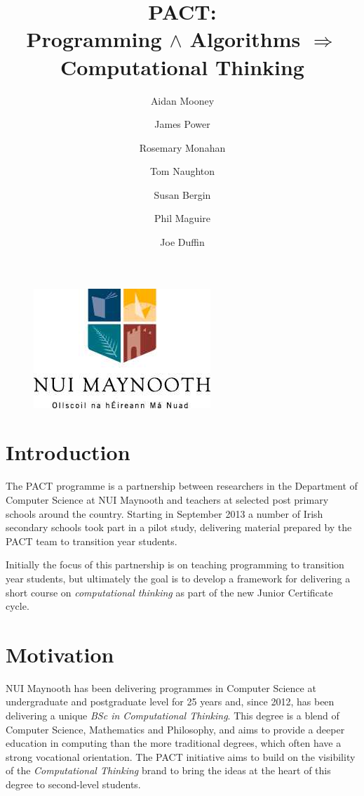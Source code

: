 \documentclass[a4paper]{article}
\begin{document}
\title{PACT: \\ {\large Programming ${\land}$ Algorithms $\Rightarrow$ Computational Thinking}}

\author{Aidan Mooney
  \and James Power
  \and Rosemary Monahan
  \and Tom Naughton
  \and Susan Bergin
  \and Phil Maguire
  \and Joe Duffin
}

\begin{figure}\centering
\includegraphics[height=.2\textheight]{nuim_large}
\end{figure}

\maketitle

\section{Introduction}
The PACT programme is a partnership between researchers in the Department of Computer Science at NUI Maynooth and teachers at selected post primary schools around the country.   Starting in September 2013 a number of Irish secondary schools took part in a pilot study, delivering material prepared by the PACT team to transition year students.

Initially the focus of this partnership is on teaching programming to transition year students, but ultimately the goal is to develop a framework for delivering a short course on \textit{computational thinking} as part of the new Junior Certificate cycle.


\section{Motivation}

NUI Maynooth has been delivering programmes in Computer Science at undergraduate and postgraduate level for 25 years and, since 2012, has been delivering a unique \textit{BSc in Computational Thinking}.  This degree is a blend of Computer Science, Mathematics and Philosophy, and aims to provide a deeper education in computing than the more traditional degrees, which often have a strong vocational orientation.  The PACT initiative aims to build on the visibility of the \textit{Computational Thinking} brand to bring the ideas at the heart of this degree to second-level students.
\end{document}
